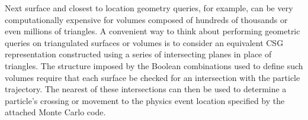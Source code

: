 Next surface and closest to location geometry queries, for example, can be very
computationally expensive for volumes composed of hundreds of thousands or even
millions of triangles. A convenient way to think about performing geometric queries on
triangulated surfaces or volumes is to consider an equivalent CSG representation
constructed using a series of intersecting planes in place of triangles. The
structure imposed by the Boolean combinations used to define such volumes
require that each surface be checked for an intersection with the particle
trajectory. The nearest of these intersections can then be used to determine a
particle's crossing or movement to the physics event location specified by the
attached Monte Carlo code.

